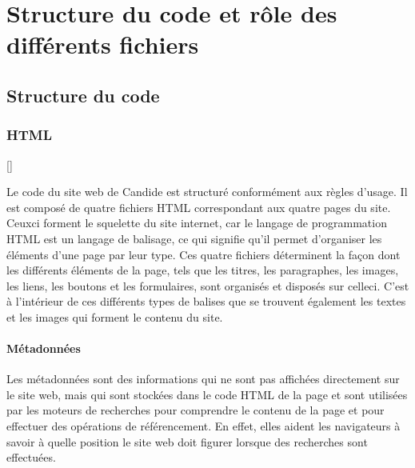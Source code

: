 \documentclass[a4,10pt,french]{sphinxmanual}
\begin{document}
\section{Structure du code et rôle des différents fichiers}
\label{\detokenize{chapitre-02:structure-du-code-et-role-des-differents-fichiers}}

\subsection{Structure du code}
\label{\detokenize{chapitre-02:structure-du-code}}

\subsubsection{HTML}
\label{\detokenize{chapitre-02:html}}
\sphinxAtStartPar
{[}{]}

\sphinxAtStartPar
Le code du site web de Candide est structuré conformément aux règles d’usage. Il est composé de quatre fichiers HTML correspondant aux quatre pages du site. Ceux\sphinxhyphen{}ci forment le squelette du site internet, car le langage de programmation HTML est un langage de balisage, ce qui signifie qu’il permet d’organiser les éléments d’une page par leur type. Ces quatre fichiers déterminent la façon dont les différents éléments de la page, tels que les titres, les paragraphes, les images, les liens, les boutons et les formulaires, sont organisés et disposés sur celle\sphinxhyphen{}ci. C’est à l’intérieur de ces différents types de balises que se trouvent également les textes et les images qui forment le contenu du site.


\paragraph{Métadonnées}
\label{\detokenize{chapitre-02:metadonnees}}
\sphinxAtStartPar
Les métadonnées sont des informations qui ne sont pas affichées directement sur le site web, mais qui sont stockées dans le code HTML de la page et sont utilisées par les moteurs de recherches pour comprendre le contenu de la page et pour effectuer des opérations de référencement. En effet, elles aident les navigateurs à savoir à quelle position le site web doit figurer lorsque des recherches sont effectuées.
\end{document}
